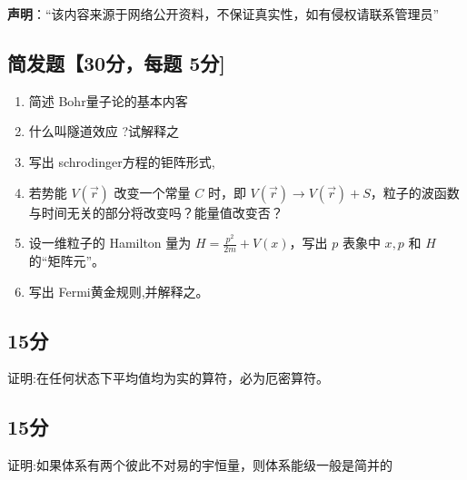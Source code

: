
\textbf{声明}：“该内容来源于网络公开资料，不保证真实性，如有侵权请联系管理员”

\subsection{简发题【30分，每题 5分]}
\begin{enumerate}
\item 简述 Bohr量子论的基本内客
\item 什么叫隧道效应 ?试解释之
\item 写出 schrodinger方程的钜阵形式,
\item 若势能 $V(\vec{r})$ 改变一个常量 $C$ 时，即 $V(\vec{r}) \rightarrow V(\vec{r}) + S$，粒子的波函数与时间无关的部分将改变吗？能量值改变否？
\item 设一维粒子的 Hamilton 量为 $H = \frac{p^2}{2m} + V(x)$，写出 $p$ 表象中 $x, p$ 和 $H$ 的“矩阵元”。
\item 写出 Fermi黄金规则,并解释之。
\end{enumerate}
\subsection{15分}
证明:在任何状态下平均值均为实的算符，必为厄密算符。
\subsection{15分}
证明:如果体系有两个彼此不对易的宇恒量，则体系能级一般是简并的
